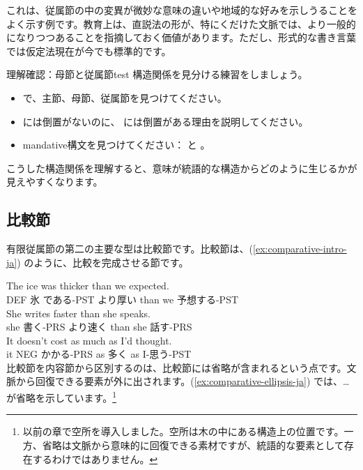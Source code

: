 これは、従属節の中の変異が微妙な意味の違いや地域的な好みを示しうることをよく示す例です。教育上は、直説法の形が、特にくだけた文脈では、より一般的になりつつあることを指摘しておく価値があります。ただし、形式的な書き言葉では仮定法現在が今でも標準的です。

\begin{tblsframedsymbol}{理解確認：母節と従属節}{test}
構造関係を見分ける練習をしましょう。
\begin{itemize}[noitemsep, leftmargin=*]
    \item {} で、主節、母節、従属節を見つけてください。
    \item {} には倒置がないのに、 には倒置がある理由を説明してください。
    \item mandative構文を見つけてください： と 。
\end{itemize}
こうした構造関係を理解すると、意味が統語的な構造からどのように生じるかが見えやすくなります。
\end{tblsframedsymbol}

\subsection{比較節}

有限従属節の第二の主要な型は比較節です。比較節は、(\ref{ex:comparative-intro-ja}) のように、比較を完成させる節です。

\ea \label{ex:comparative-intro-ja}
    \ea \gll The ice was thicker than {\ob}we expected{\cb}.\\
        DEF 氷 である-PST より厚い than we 予想する-PST\\
    \glt {}
    \ex \gll She writes faster than {\ob}she speaks{\cb}.\\
        she 書く-PRS より速く than she 話す-PRS\\
    \glt {}
    \ex \gll It doesn't cost as much as {\ob}I'd thought{\cb}.\\
        it NEG かかる-PRS as 多く as I-思う-PST\\
    \glt {}
    \z
\z
比較節を内容節から区別するのは、比較節には省略が含まれるという点です。文脈から回復できる要素が外に出されます。(\ref{ex:comparative-ellipsis-ja}) では、\dots が省略を示しています。\footnote{以前の章で空所を導入しました。空所は木の中にある構造上の位置です。一方、省略は文脈から意味的に回復できる素材ですが、統語的な要素として存在するわけではありません。}

